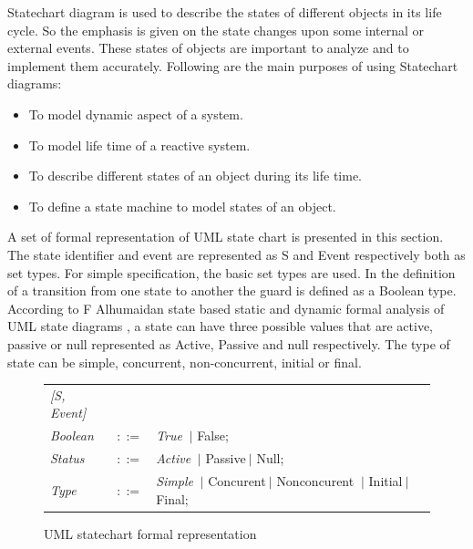 Statechart diagram is used to describe the states of different objects in its life cycle. So the emphasis is given on the state changes upon some internal or external events. These states of objects are important to analyze and to implement them accurately. Following are the main purposes of using Statechart diagrams:

\begin{itemize}
	\item To model dynamic aspect of a system.
	
	\item To model life time of a reactive system.
	
	\item To describe different states of an object during its life time.
	
	\item To define a state machine to model states of an object.
\end{itemize}

A set of formal representation of UML state chart is presented in this section. The state identifier and event are represented as S and Event respectively both as set types. For simple specification, the basic set types are used. In the definition of a transition from one state to another the guard is defined as a Boolean type. According to F Alhumaidan state based static and dynamic formal analysis of UML state diagrams \cite{ref_16_alhumaidan2012state} , a state can have three possible values that are active, passive or null represented as Active, Passive and null respectively. The type of state can be simple, concurrent, non-concurrent, initial or final.

\begin{figure}[ht!]
	\centering
	\begin{tabular}{lll}
		\footnotesize                       
		\textit{[S, Event]}          &\footnotesize \\
		
		\footnotesize
		\textit{Boolean}            &\footnotesize $::=$         &\footnotesize \textit{True} $\ \vert $ {False};       \\   
		\footnotesize
		\textit{Status}            &\footnotesize $::=$         &\footnotesize \textit{Active}
		 $\ \vert $ {Passive}$\ \vert $ {Null};       \\ 
		\footnotesize
		\textit{Type}            &\footnotesize $::=$         &\footnotesize \textit{Simple}
		 	$\ \vert $ {Concurent}$\ \vert $ {Nonconcurent} $\ \vert $ {Initial}$\ \vert $ {Final};       \\	 	 
		
	\end{tabular}
	\vspace{1em}
	\caption{UML statechart formal representation}
	\label{statechart_formal_representation}
\end{figure}

